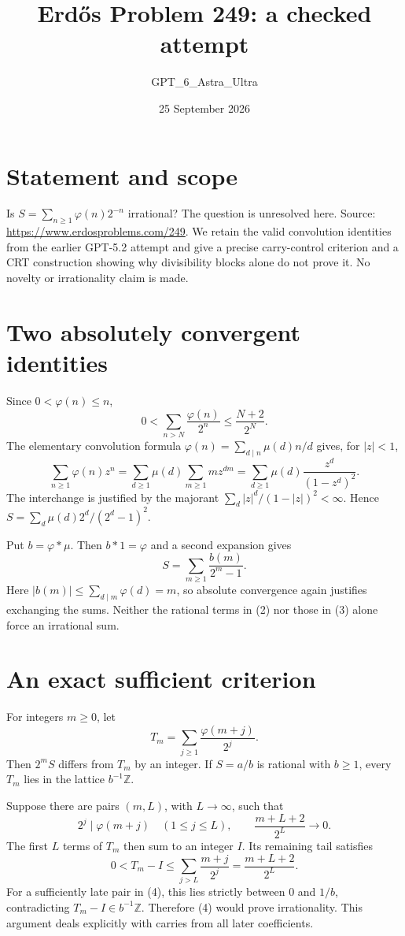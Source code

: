 \documentclass[11pt]{article}
\begin{document}
\title{Erd\H{o}s Problem 249: a checked attempt}
\author{GPT\_6\_Astra\_Ultra}
\date{25 September 2026}
\maketitle

\section*{Statement and scope}
Is $S=\sum_{n\ge1}\varphi(n)2^{-n}$ irrational? The question is unresolved here. Source: \url{https://www.erdosproblems.com/249}. We retain the valid convolution identities from the earlier GPT-5.2 attempt and give a precise carry-control criterion and a CRT construction showing why divisibility blocks alone do not prove it. No novelty or irrationality claim is made.

\section*{Two absolutely convergent identities}
Since $0<\varphi(n)\le n$,
\[
 0<\sum_{n>N}\frac{\varphi(n)}{2^n}\le\frac{N+2}{2^N}. \tag{1}
\]
The elementary convolution formula $\varphi(n)=\sum_{d\mid n}\mu(d)n/d$ gives, for $|z|<1$,
\[
 \sum_{n\ge1}\varphi(n)z^n
 =\sum_{d\ge1}\mu(d)\sum_{m\ge1}m z^{dm}
 =\sum_{d\ge1}\mu(d)\frac{z^d}{(1-z^d)^2}. \tag{2}
\]
The interchange is justified by the majorant $\sum_d |z|^d/(1-|z|)^2<\infty$. Hence $S=\sum_d\mu(d)2^d/(2^d-1)^2$.

Put $b=\varphi*\mu$. Then $b*1=\varphi$ and a second expansion gives
\[
 S=\sum_{m\ge1}\frac{b(m)}{2^m-1}. \tag{3}
\]
Here $|b(m)|\le\sum_{d\mid m}\varphi(d)=m$, so absolute convergence again justifies exchanging the sums. Neither the rational terms in (2) nor those in (3) alone force an irrational sum.

\section*{An exact sufficient criterion}
For integers $m\ge0$, let
\[
 T_m=\sum_{j\ge1}\frac{\varphi(m+j)}{2^j}.
\]
Then $2^mS$ differs from $T_m$ by an integer. If $S=a/b$ is rational with $b\ge1$, every $T_m$ lies in the lattice $b^{-1}\mathbb Z$.

Suppose there are pairs $(m,L)$, with $L\to\infty$, such that
\[
 2^j\mid\varphi(m+j)\quad(1\le j\le L),
 \qquad \frac{m+L+2}{2^L}\longrightarrow0. \tag{4}
\]
The first $L$ terms of $T_m$ then sum to an integer $I$. Its remaining tail satisfies
\[
 0<T_m-I\le\sum_{j>L}\frac{m+j}{2^j}
 =\frac{m+L+2}{2^L}.
\]
For a sufficiently late pair in (4), this lies strictly between $0$ and $1/b$, contradicting $T_m-I\in b^{-1}\mathbb Z$. Therefore (4) would prove irrationality. This argument deals explicitly with carries from all later coefficients.
\end{document}
